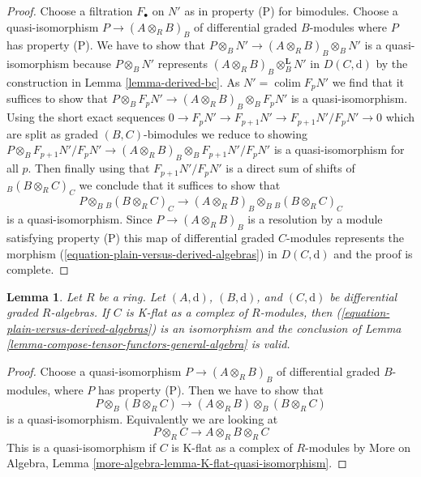 \documentclass{stacks-project}
\theoremstyle{plain}
\newtheorem{lemma}[subsection]{Lemma}
\theoremstyle{definition}
\theoremstyle{remark}
\numberwithin{equation}{subsection}
\def\colim{\mathop{\mathrm{colim}}\nolimits}
\begin{document}
\begin{proof}
\medskip\noindent
Choose a filtration $F_\bullet$ on $N'$ as in property (P) for bimodules.
Choose a quasi-isomorphism $P \to (A \otimes_R B)_B$
of differential graded $B$-modules where $P$ has property (P).
We have to show that
$P \otimes_B N' \to (A \otimes_R B)_B \otimes_B N'$ is
a quasi-isomorphism because $P \otimes_B N'$ represents
$(A \otimes_R B)_B \otimes_B^\mathbf{L} N'$ in $D(C, \text{d})$
by the construction in Lemma \ref{lemma-derived-bc}.
As $N' = \colim F_pN'$ we find
that it suffices to show that
$P \otimes_B F_pN' \to (A \otimes_R B)_B \otimes_B F_pN'$
is a quasi-isomorphism. Using the short exact sequences
$0 \to F_pN' \to F_{p + 1}N' \to F_{p + 1}N'/F_pN' \to 0$
which are split as graded $(B, C)$-bimodules we reduce to showing
$P \otimes_B F_{p + 1}N'/F_pN' \to
(A \otimes_R B)_B \otimes_B F_{p + 1}N'/F_pN'$
is a quasi-isomorphism for all $p$.
Then finally using that $F_{p + 1}N'/F_pN'$
is a direct sum of shifts of ${}_B(B \otimes_R C)_C$
we conclude that it suffices to show that
$$
P \otimes_B {}_B(B \otimes_R C)_C \to
(A \otimes_R B)_B \otimes_B {}_B(B \otimes_R C)_C
$$
is a quasi-isomorphism. Since $P \to (A \otimes_R B)_B$
is a resolution by a module satisfying property (P)
this map of differential graded $C$-modules
represents the morphism (\ref{equation-plain-versus-derived-algebras})
in $D(C, \text{d})$ and the proof is complete.
\end{proof}

\begin{lemma}
\label{lemma-compose-tensor-functors}
Let $R$ be a ring. Let $(A, \text{d})$, $(B, \text{d})$, and
$(C, \text{d})$ be differential graded $R$-algebras.
If $C$ is K-flat as a complex of $R$-modules, then
(\ref{equation-plain-versus-derived-algebras})
is an isomorphism and the conclusion of
Lemma \ref{lemma-compose-tensor-functors-general-algebra} is valid.
\end{lemma}

\begin{proof}
Choose a quasi-isomorphism $P \to (A \otimes_R B)_B$ of differential
graded $B$-modules, where $P$ has property (P). Then we have to show
that
$$
P \otimes_B (B \otimes_R C) \longrightarrow
(A \otimes_R B) \otimes_B (B \otimes_R C)
$$
is a quasi-isomorphism. Equivalently we are looking at
$$
P \otimes_R C \longrightarrow
A \otimes_R B \otimes_R C
$$
This is a quasi-isomorphism if $C$ is K-flat as a complex of $R$-modules by
More on Algebra, Lemma \ref{more-algebra-lemma-K-flat-quasi-isomorphism}.
\end{proof}
\end{document}
